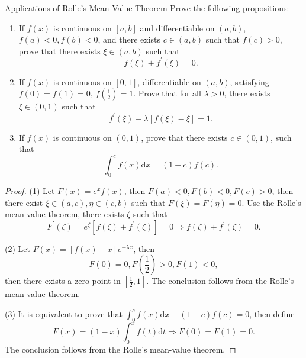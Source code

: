 \begin{example}{Applications of Rolle's Mean-Value Theorem}{}
  Prove the following propositions:
  \begin{enumerate}
  \item If $f(x)$ is continuous on $[a, b]$ and differentiable on $(a, b)$,
    $f(a) < 0, f(b) < 0$, and there exists $c \in (a, b)$ such that $f(c) > 0$,
    prove that there exists $\xi \in (a, b)$ such that
    \begin{equation}
      f(\xi) + f^{\prime}(\xi) = 0.
    \end{equation}
  \item If $f(x)$ is continuous on $[0, 1]$, differentiable on $(a, b)$,
    satisfying $f(0) = f(1) = 0$, $f(\frac{1}{2}) = 1$.
    Prove that for all $\lambda > 0$, there exists $\xi \in (0, 1)$ such that
    \begin{equation}
      f^{\prime}(\xi) - \lambda [f(\xi) - \xi] = 1.
    \end{equation}
  \item If $f(x)$ is continuous on $(0, 1)$, prove that there exists $c \in (0,
    1)$, such that
    \begin{equation}
      \int_0^cf(x)\mathrm{d}x = (1-c)f(c).
    \end{equation}
  \end{enumerate}
\end{example}

\begin{proof}
  (1) Let $F(x) = e^xf(x)$, then $F(a) < 0, F(b) < 0, F(c) > 0$,
  then there exist $\xi \in (a, c), \eta \in (c, b)$ such that
  $F(\xi) = F(\eta) = 0$.
  Use the Rolle's mean-value theorem, there exists $\zeta$ such that
  \begin{equation}
    F^{\prime}(\zeta) = e^{\zeta}[ f(\zeta) + f^{\prime}(\zeta)] = 0
    \Rightarrow f(\zeta) + f^{\prime}(\zeta) = 0.
  \end{equation}

  (2) Let $F(x) = [f(x) - x]e^{-\lambda x}$, then
  \begin{equation}
     F(0) = 0, F(\frac{1}{2}) > 0, F(1) < 0,
  \end{equation}
  then there exists a zero point in $[\frac{1}{2}, 1]$.
  The conclusion follows from the Rolle's mean-value theorem.

  (3) It is equivalent to prove that $\int_0^c f(x)\mathrm{d} x - (1-c)f(c) =
  0$,
  then define
  \begin{equation}
    F(x) = (1-x)\int_0^xf(t)\mathrm{d} t \Rightarrow
    F(0) = F(1) = 0.
  \end{equation}
  The conclusion follows from the Rolle's mean-value theorem.

\end{proof}

